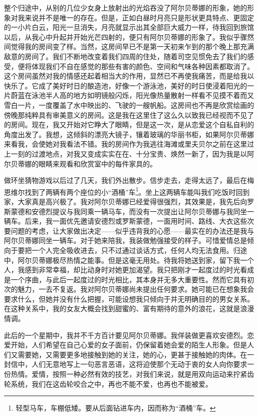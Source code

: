 \par 整个归途中，从别的几位少女身上放射出的光焰吞没了阿尔贝蒂娜的形象，她的形象对我来说并不是唯一的存在。但是，正如白昼时月亮只是形状更具特点、更固定的一小片白云，阳光一旦消失，月亮就显示出其全部巨大威力一样，待我回到旅馆以后，从我心中升起并开始光芒四射的，便只有阿尔贝蒂娜的形象了。我似乎骤然间觉得我的房间变了样。当然，这房间早已不是第一天初来乍到的那个晚上那充满敌意的房间了。我们不断地改变着我们四周的住处，随着司空见惯免去了我们的感受，便将体现我们不自在感觉的那些有害的颜色、空间和气味各种因素都取消了。这个房间虽然对我的情感还起着相当大的作用，显然已不再使我痛苦，而是给我以快乐了。它成了美好时日的酿造池，好像一个游泳池，美好的时日使浸着阳光的一片蔚蓝在泳池半人高的地方如明镜般闪烁，阳光像热量散射一样看不见摸不着而又雪白一片，一度覆盖了水中映出的、飞驶的一艘帆船。这房间也不再是欣赏绘画的傍晚那纯粹具有审美意义的房间。这是我在这里住了这么久以致我已经视而不见了的房间。现在，我又开始对它睁大了眼睛，但是这一次，是从恋爱这个自私自利的角度出发了。我想，这倾斜的漂亮大镜子，镶着玻璃的华丽书柜，如果阿尔贝蒂娜来看我，会使她对我看法不错。我的房间作为我逃往海滩或里夫贝尔之前在这里过上一刻的过渡地点，对我又变成实实在在、十分宝贵、焕然一新了，因为我是以阿尔贝蒂娜的眼睛来观看和欣赏室中的每件家具的。
\par 做环坐猜物游戏以后过了几天，我们外出散步。信步走去，走得太远了，最后在梅恩维尔找到了两辆有两个座位的小“酒桶”车\footnote{轻型马车，车棚低矮。要从后面钻进车内，因而称为“酒桶”车。}。坐上这两辆车能叫我们吃饭时回到家，大家真是高兴极了。我对阿尔贝蒂娜已经爱得很强烈，其效果是，我先后向罗斯蒙德和安德烈提议与我同乘一辆马车，而没有一次提出让阿尔贝蒂娜与我同坐一辆车。后来，我一面优先邀请安德烈或罗斯蒙德，一面用时间、路线、大衣这些次要问题的考虑，让大家做出决定——似乎违背我的心愿——最实在的办法还是我与阿尔贝蒂娜同坐一辆车。对于她来陪我，我装做勉强接受的样子。可惜爱情总是倾向于要把一个人完全吸收进去，只不过通过谈话方式，任何人均无法食用。归途中，阿尔贝蒂娜极尽热情之能事。但是这毫无用处。待我将她送到家，留下我一个人，我感到非常幸福，却比动身时对她更加渴望。我只把刚才一起度过的时光看成是一个序曲，与此后一起度过的时光相比，其本身并无多大重要性。然而它具有初次的魅力，一去不复返。我对阿尔贝蒂娜尚未提出任何要求。她可能已在想象我会要求什么，但她并没有什么把握，可能设想我只倾向于并无明确目的的男女关系。在这种关系中，我的女友大概会找到甜蜜的、富有期待的意外的浪花，这就是浪漫情调。
\par 此后的一个星期中，我并不千方百计要见阿尔贝蒂娜。我佯装做更喜欢安德烈。恋爱开始，人们希望在自己心爱的女子面前，仍保留着她会爱的陌生人形象。但是人们又需要她，又需要更多地接触到她的关注，她的心，更甚于接触她的肉体。在一封信中，人们无意地写上一句恶言恶语，这将迫使那个无动于衷的女人向你要求一份热情。爱情，按照一种必然有效的技艺，对我们来说，就是用双向运动来拧紧齿轮系统，我们在这齿轮咬合之中，再也不能不爱，也再也不能被爱。
